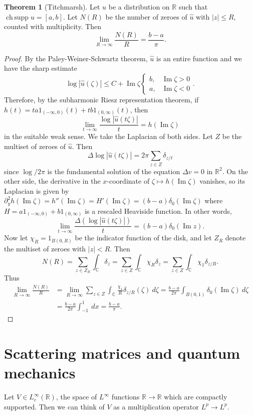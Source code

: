 \documentclass[12pt]{report}
\newcommand{\RR}{\mathbb{R}}
\newcommand{\CC}{\mathbb{C}}
\DeclareMathOperator*{\chsupp}{ch\,supp}
\renewcommand{\Im}{\operatorname{Im}}
\theoremstyle{definition}
\newtheorem{theorem}{Theorem}[chapter]
\begin{document}
\begin{defintion}
\begin{theorem}[Titchmarsh]
Let $u$ be a distribution on $\RR$ such that $\chsupp u = [a, b]$. Let $N(R)$ be the number of zeroes of $\hat u$ with $|z| \leq R$, counted with multiplicity. Then
$$\lim_{R \to \infty} \frac{N(R)}{R} = \frac{b-a}{\pi}.$$
\end{theorem}
\begin{proof}
By the Paley-Weiner-Schwartz theorem, $\hat u$ is an entire function and we have the sharp estimate
$$\log |\hat u(\zeta)| \leq C + \Im \zeta \begin{cases}
    b, &\Im \zeta > 0\\
    a, &\Im \zeta < 0
\end{cases}.$$
Therefore, by the subharmonic Riesz representation theorem, if $h(t) = ta1_{(-\infty, 0)}(t) + tb1_{(0, \infty)}(t)$, then
$$\lim_{t \to \infty} \frac{\log |\hat u(t\zeta)|}{t} = h(\Im \zeta)$$
in the suitable weak sense. We take the Laplacian of both sides. Let $Z$ be the multiset of zeroes of $\hat u$. Then
$$\Delta \log |\hat u(t \zeta)| = 2\pi \sum_{z \in Z} \delta_{z/t}$$
since $\log/2\pi$ is the fundamental solution of the equation $\Delta v = 0$ in $\RR^2$. On the other side, the derivative in the $x$-coordinate of $\zeta \mapsto h(\Im \zeta)$ vanishes, so its Laplacian is given by $\partial_y^2 h(\Im \zeta) = h''(\Im \zeta) = H'(\Im \zeta) = (b-a)\delta_0(\Im \zeta)$ where $H = a1_{(-\infty, 0)} + b1_{(0, \infty)}$ is a rescaled Heaviside function. In other words,
$$\lim_{t \to \infty} \frac{\Delta(\log |\hat u(t\zeta)|)}{t} = (b-a)\delta_0(\Im z).$$
Now let $\chi_R = 1_{B(0, R)}$ be the indicator function of the disk, and let $Z_R$ denote the multiset of zeroes with $|z| < R$. Then
$$N(R) = \sum_{z \in Z_R} \int_\CC \delta_z = \sum_{z \in Z} \int_\CC \chi_R \delta_z = \sum_{z \in Z} \int_\CC \chi_1 \delta_{z/R}.$$
Thus
\begin{align*}
    \lim_{R \to \infty} \frac{N(R)}{R}
        &= \lim_{R \to \infty} \sum_{z \in Z} \int_\CC \frac{\chi_1}{R} \delta_{z/R}(\zeta) ~d\zeta = \frac{b - a}{2\pi} \int_{B(0, 1)} \delta_0(\Im \zeta) ~d\zeta\\
        &= \frac{b - a}{2 \pi} \int_{-1}^1 ~dx = \frac{b - a}{\pi}.
\end{align*}
\end{proof}




\section{Scattering matrices and quantum mechanics}
Let $V \in L^\infty_c(\RR)$, the space of $L^\infty$ functions $\RR \to \RR$ which are compactly supported. Then we can think of $V$ as a multiplication operator $L^p \to L^p$.


\end{defintion}
\end{document}
